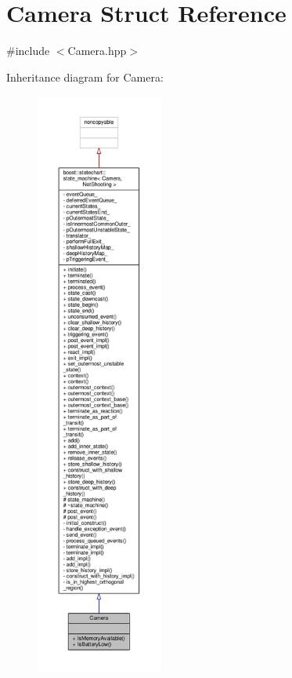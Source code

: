 \hypertarget{struct_camera}{}\section{Camera Struct Reference}
\label{struct_camera}


{\ttfamily \#include $<$Camera.\+hpp$>$}



Inheritance diagram for Camera\+:
\nopagebreak
\begin{figure}[H]
\begin{center}
\leavevmode
\includegraphics[height=550pt]{struct_camera__inherit__graph}
\end{center}
\end{figure}


